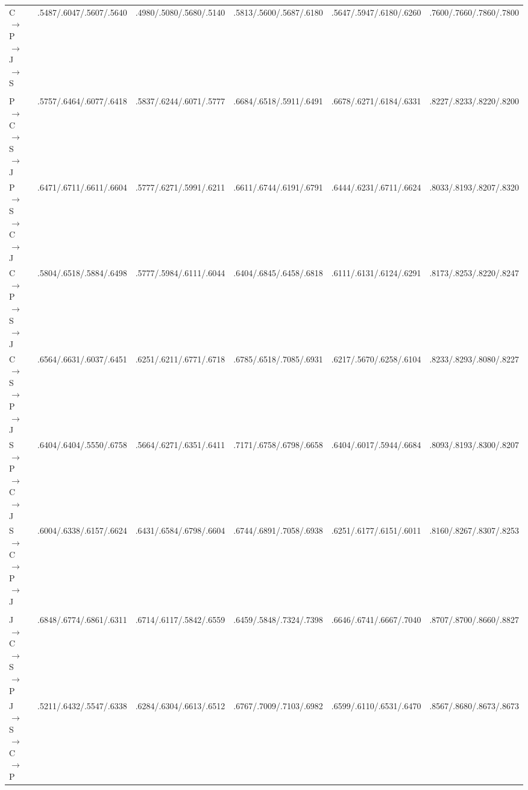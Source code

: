 \begin{table}[!htbp]
\begin{adjustbox}{width=0.95\textwidth}
\begin{tabular}{@{}lccccc@{}}
C $\rightarrow$ P $\rightarrow$ J $\rightarrow$ S
& .5487/.6047/.5607/.5640
& .4980/.5080/.5680/.5140
& .5813/.5600/.5687/.6180
& .5647/.5947/.6180/.6260
& .7600/.7660/.7860/.7800 \\


\addlinespace[1pt]
\rowcolor{black!7}
\multicolumn{6}{@{}l}{\textit{Target Java (J)}} \\

P $\rightarrow$ C $\rightarrow$ S $\rightarrow$ J
& .5757/.6464/.6077/.6418
& .5837/.6244/.6071/.5777
& .6684/.6518/.5911/.6491
& .6678/.6271/.6184/.6331
& .8227/.8233/.8220/.8200 \\

P $\rightarrow$ S $\rightarrow$ C $\rightarrow$ J
& .6471/.6711/.6611/.6604
& .5777/.6271/.5991/.6211
& .6611/.6744/.6191/.6791
& .6444/.6231/.6711/.6624
& .8033/.8193/.8207/.8320 \\

C $\rightarrow$ P $\rightarrow$ S $\rightarrow$ J
& .5804/.6518/.5884/.6498
& .5777/.5984/.6111/.6044
& .6404/.6845/.6458/.6818
& .6111/.6131/.6124/.6291
& .8173/.8253/.8220/.8247 \\

C $\rightarrow$ S $\rightarrow$ P $\rightarrow$ J
& .6564/.6631/.6037/.6451
& .6251/.6211/.6771/.6718
& .6785/.6518/.7085/.6931
& .6217/.5670/.6258/.6104
& .8233/.8293/.8080/.8227 \\

S $\rightarrow$ P $\rightarrow$ C $\rightarrow$ J
& .6404/.6404/.5550/.6758
& .5664/.6271/.6351/.6411
& .7171/.6758/.6798/.6658
& .6404/.6017/.5944/.6684
& .8093/.8193/.8300/.8207 \\

S $\rightarrow$ C $\rightarrow$ P $\rightarrow$ J
& .6004/.6338/.6157/.6624
& .6431/.6584/.6798/.6604
& .6744/.6891/.7058/.6938
& .6251/.6177/.6151/.6011
& .8160/.8267/.8307/.8253 \\


\addlinespace[1pt]
\rowcolor{black!7}
\multicolumn{6}{@{}l}{\textit{Target Python (P)}} \\

J $\rightarrow$ C $\rightarrow$ S $\rightarrow$ P
& .6848/.6774/.6861/.6311
& .6714/.6117/.5842/.6559
& .6459/.5848/.7324/.7398
& .6646/.6741/.6667/.7040
& .8707/.8700/.8660/.8827 \\

J $\rightarrow$ S $\rightarrow$ C $\rightarrow$ P
& .5211/.6432/.5547/.6338
& .6284/.6304/.6613/.6512
& .6767/.7009/.7103/.6982
& .6599/.6110/.6531/.6470
& .8567/.8680/.8673/.8673 \\


\end{tabular}
\end{adjustbox}
\end{table}
